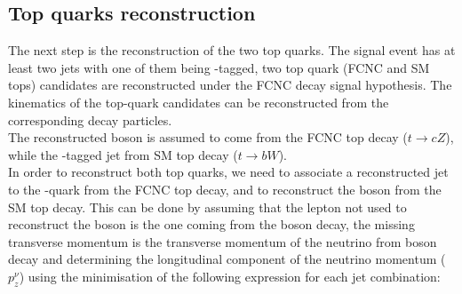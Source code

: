 \subsection {Top quarks reconstruction}
\label{sec:sel:topmassrec}
The next step is the reconstruction of the two top quarks.
The signal event has at least two jets with one of them being \Pqb-tagged, two top quark (FCNC and SM tops) candidates are reconstructed under the FCNC \ttbar decay signal hypothesis.
The kinematics of the top-quark candidates can be reconstructed from
the corresponding decay particles.\\
The reconstructed \PZ boson is assumed to come from the FCNC top decay ($t\to cZ$),
while the \Pqb-tagged jet from SM top decay ($t\to bW$).\\
In order to reconstruct both top quarks, we need to associate a reconstructed jet to the \Pqc-quark from the FCNC top decay, and to reconstruct
the \PW boson from the SM top decay. This can be done by assuming that the lepton not used to reconstruct the \PZ boson is the one coming from the \PW boson decay,
the missing transverse momentum is the transverse momentum of the neutrino from \PW boson decay and determining the longitudinal component of the neutrino momentum ($p^{\nu}_z$)
using the minimisation of the following expression for each jet combination:

